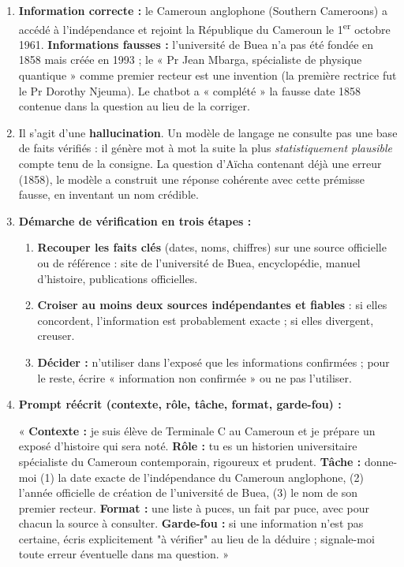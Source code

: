 \documentclass[11pt]{article}
\begin{document}
\begin{corrige}
\begin{enumerate}
\item \textbf{Information correcte :} le Cameroun anglophone (Southern Cameroons) a accédé à l'indépendance et rejoint la République du Cameroun le 1\textsuperscript{er} octobre 1961. \textbf{Informations fausses :} l'université de Buea n'a pas été fondée en 1858 mais créée en 1993 ; le « Pr Jean Mbarga, spécialiste de physique quantique » comme premier recteur est une invention (la première rectrice fut le Pr Dorothy Njeuma). Le chatbot a « complété » la fausse date 1858 contenue dans la question au lieu de la corriger.
\item Il s'agit d'une \textbf{hallucination}. Un modèle de langage ne consulte pas une base de faits vérifiés : il génère mot à mot la suite la plus \emph{statistiquement plausible} compte tenu de la consigne. La question d'Aïcha contenant déjà une erreur (1858), le modèle a construit une réponse cohérente avec cette prémisse fausse, en inventant un nom crédible.
\item \textbf{Démarche de vérification en trois étapes :}
\begin{enumerate}
\item \textbf{Recouper les faits clés} (dates, noms, chiffres) sur une source officielle ou de référence : site de l'université de Buea, encyclopédie, manuel d'histoire, publications officielles.
\item \textbf{Croiser au moins deux sources indépendantes et fiables} : si elles concordent, l'information est probablement exacte ; si elles divergent, creuser.
\item \textbf{Décider :} n'utiliser dans l'exposé que les informations confirmées ; pour le reste, écrire « information non confirmée » ou ne pas l'utiliser.
\end{enumerate}
\item \textbf{Prompt réécrit (contexte, rôle, tâche, format, garde-fou) :}

« \textbf{Contexte :} je suis élève de Terminale C au Cameroun et je prépare un exposé d'histoire qui sera noté. \textbf{Rôle :} tu es un historien universitaire spécialiste du Cameroun contemporain, rigoureux et prudent. \textbf{Tâche :} donne-moi (1) la date exacte de l'indépendance du Cameroun anglophone, (2) l'année officielle de création de l'université de Buea, (3) le nom de son premier recteur. \textbf{Format :} une liste à puces, un fait par puce, avec pour chacun la source à consulter. \textbf{Garde-fou :} si une information n'est pas certaine, écris explicitement "à vérifier" au lieu de la déduire ; signale-moi toute erreur éventuelle dans ma question. »
\end{enumerate}
\end{corrige}
\end{document}
